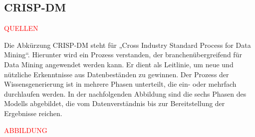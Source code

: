 \subsection{CRISP-DM}

{\textcolor{red}{QUELLEN}}

Die Abkürzung CRISP-DM steht für „Cross Industry Standard Process for Data Mining“.
Hierunter wird ein Prozess verstanden, der branchenübergreifend für Data Mining angewendet werden kann.
Er dient als Leitlinie, um neue und nützliche Erkenntnisse aus Datenbeständen zu gewinnen.
Der Prozess der Wissensgenerierung ist in mehrere Phasen unterteilt, die ein- oder mehrfach durchlaufen werden.
In der nachfolgenden Abbildung sind die sechs Phasen des Modells abgebildet, die vom Datenverständnis bis zur
Bereitstellung der Ergebnisse reichen.

    {\textcolor{red}{ABBILDUNG}}

